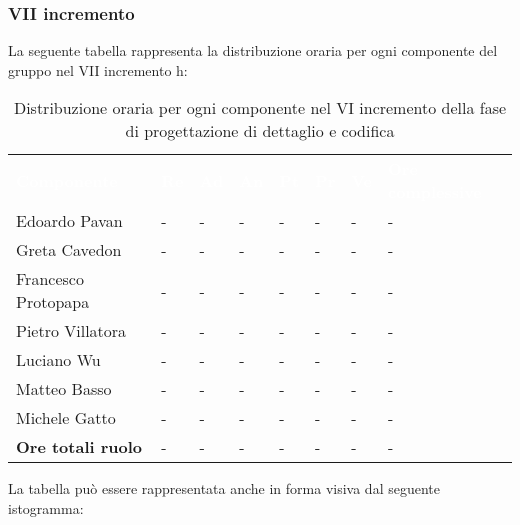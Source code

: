 \subsubsection{VII incremento}
La seguente tabella rappresenta la distribuzione oraria per ogni componente del gruppo nel VII incremento h:
\begin{table}[!htbp]
\begin{center}
\renewcommand{\arraystretch}{1.25}
\begin{tabular}{ m{}<{\centering}  m{}<{\centering} m{}<{\centering} m{}<{\centering}  m{}<{\centering}  m{}<{\centering}  m{}<{\centering}  m{}<{\centering}   }
	\rowcolor{darkblue}
	\textcolor{white}{\textbf{Componente}} &\textcolor{white}{\textbf{Re}}&\textcolor{white}{\textbf{Ad}}&\textcolor{white}{\textbf{An}}&\textcolor{white}{\textbf{Pt}}&\textcolor{white}{\textbf{Pr}}&\textcolor{white}{\textbf{Ve}}&\textcolor{white}{\textbf{Ore complessive}}\\ 

	Edoardo Pavan & - & - & - & - & - & - & -\\	

	Greta Cavedon & - & - & - & - & - & - & -\\
	
	Francesco Protopapa & - & - & - & - & - & - & -\\
	
	Pietro Villatora & - & - & - & - & - & - & -\\
	
	Luciano Wu & - & - & - & - & - & - & -\\
	
	Matteo Basso & - & - & - & - & - & - & -\\
	
	Michele Gatto & - & - & - & - & - & - & -\\
	
	\textbf{Ore totali ruolo} & - & - & - & - & - & - & -\\

\end{tabular}
\caption{Distribuzione oraria per ogni componente nel VI incremento della fase di progettazione di dettaglio e codifica}
\end{center}
\end{table}

La tabella può essere rappresentata anche in forma visiva dal seguente istogramma:

